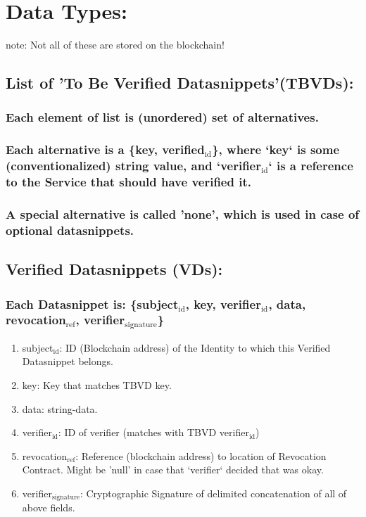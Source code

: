 \documentclass[11pt]{article}
\begin{document}
\section{Data Types:}
\label{sec:org6c653a6}
note: Not all of these are stored on the blockchain!
\subsection{List of 'To Be Verified Datasnippets'(TBVDs):}
\label{sec:org90628f4}
\subsubsection{Each element of list is (unordered) set of alternatives.}
\label{sec:org4e5a05a}
\subsubsection{Each alternative is a \{key, verified\(_{\text{id}}\)\}, where `key` is some (conventionalized) string value, and `verifier\(_{\text{id}}\)` is a reference to the Service that should have verified it.}
\label{sec:org2bbc6db}
\subsubsection{A special alternative is called 'none', which is used in case of optional datasnippets.}
\label{sec:org2503dcb}
\subsection{Verified Datasnippets (VDs):}
\label{sec:org83193ae}
\subsubsection{Each Datasnippet is: \{subject\(_{\text{id}}\), key, verifier\(_{\text{id}}\), data, revocation\(_{\text{ref}}\), verifier\(_{\text{signature}}\)\}}
\label{sec:orge8c6330}
\begin{enumerate}
\item subject\(_{\text{id}}\): ID (Blockchain address) of the Identity to which this Verified Datasnippet belongs.
\label{sec:org0f62ac1}
\item key: Key that matches TBVD key.
\label{sec:org9d4e415}
\item data: string-data.
\label{sec:org3cf626d}
\item verifier\(_{\text{id}}\): ID of verifier (matches with TBVD verifier\(_{\text{id}}\))
\label{sec:org069a0aa}
\item revocation\(_{\text{ref}}\): Reference (blockchain address) to location of Revocation Contract. Might be 'null' in case that `verifier` decided that was okay.
\label{sec:orgd025f7d}
\item verifier\(_{\text{signature}}\): Cryptographic Signature of delimited concatenation of all of above fields.
\label{sec:orgb581ca0}
\end{enumerate}
\end{document}
